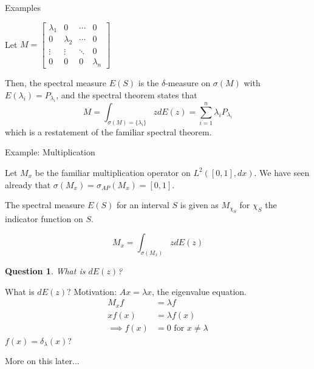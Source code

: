 \documentclass{beamer}
\newtheorem{question}{Question}[section]
\begin{document}
\begin{frame}{Examples}
    \begin{example}
        Let $M = 
            \begin{bmatrix}
                \lambda_1 & 0 & \cdots & 0 \\
                0 & \lambda_2 & \cdots & 0 \\
                \vdots & \vdots & \ddots & 0\\
                0 & 0 & 0 & \lambda_n 
            \end{bmatrix}$

            Then, the spectral measure $E(S)$ is the $\delta$-measure on
            $\sigma(M)$ with $E(\lambda_i) = P_{\lambda_i}$, and the spectral
            theorem states that
            \[
                M = \int_{\sigma(M) = \{\lambda_i\}} zdE(z)
                  = \sum_{i=1}^n \lambda_i P_{\lambda_i}
                  \]
            which is a restatement of the familiar spectral theorem.
    \end{example}

\end{frame}

\begin{frame}{Example: Multiplication}
    \begin{example}
        Let $M_x$ be the familiar multiplication operator on $L^2([0,1],dx)$.
        We have seen already that $\sigma(M_x) = \sigma_{AP}(M_x) = [0,1]$.

        The spectral measure $E(S)$ for an interval $S$ is given as $M_{\chi_S}$
        for $\chi_S$ the indicator function on $S$.
    \end{example}
    \[
        M_x = \int_{\sigma(M_x)} zdE(z)
        \]
    \pause
    \begin{question}
        What is $dE(z)$?
    \end{question}
\end{frame}
\begin{frame}{What is $dE(z)$?}
    Motivation: $Ax=\lambda x$, the eigenvalue equation.
    \[
        \begin{aligned}
            M_x f &= \lambda f\\
            xf(x) &= \lambda f(x)\\
            \implies f(x) &= 0 \text{ for } x\not= \lambda
        \end{aligned}
        \]
    \pause
    $f(x) = \delta_{\lambda}(x)$?

    More on this later...
\end{frame}
\end{document}
